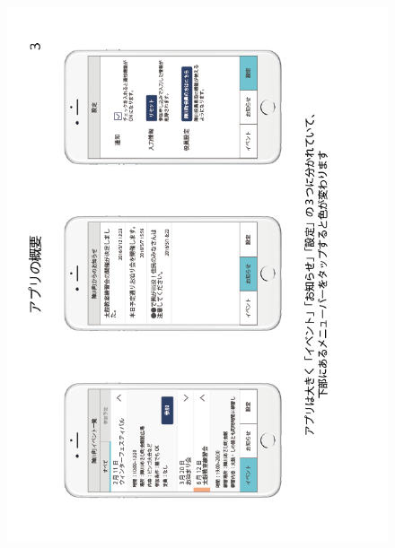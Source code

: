 \begin{figure}[h]
    \begin{center}
      \includegraphics[keepaspectratio, scale=0.7]{appendixs/appendixB_figres/fig3.png}
    \end{center}
\end{figure}

